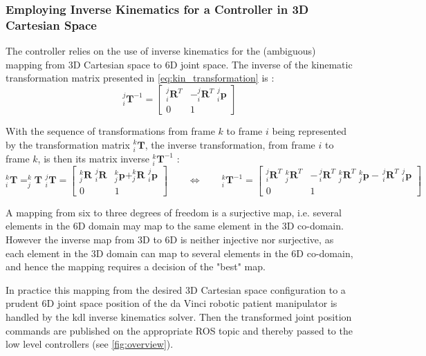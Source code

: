 \subsubsection{Employing Inverse Kinematics for a Controller in 3D Cartesian Space}
The controller relies on the use of inverse kinematics for the (ambiguous) mapping from 3D Cartesian space to 6D joint space. The inverse of the kinematic transformation matrix presented in \autoref{eq:kin_transformation} is \citep{bib:math_robotics}:
\begin{equation}
^j_i\textbf{T}^{-1} = 
\begin{bmatrix}
^j_i\textbf{R}^T & -^j_i\textbf{R}^T\,\,^j_i\textbf{p}\\
0 & 1
\end{bmatrix}
\end{equation}

With the sequence of transformations from frame $k$ to frame $i$ being represented by the transformation matrix $^k_i \textbf{T}$, the inverse transformation, from frame $i$ to frame $k$, is then its matrix inverse $^k_i \textbf{T}^{-1}$ \citep{bib:math_robotics}:
\begin{equation}
^k_i\textbf{T} = ^k_j\textbf{T} \,\, ^j_i\textbf{T} =
\begin{bmatrix}
^k_j\textbf{R} \,\, ^j_i\textbf{R} & ^k_j\textbf{p}+^k_j\textbf{R} \,\, ^j_i\textbf{p}\\
0 & 1
\end{bmatrix}
\qquad \Leftrightarrow \qquad
^k_i\textbf{T}^{-1} = 
\begin{bmatrix}
^j_i\textbf{R}^T\,\, ^k_j\textbf{R}^T & -\,^j_i\textbf{R}^T\,\, ^k_j\textbf{R}^T\,\,^k_j\textbf{p} -\, ^j_i\textbf{R}^T\,\, ^j_i\textbf{p}\\
0 & 1
\end{bmatrix}
\end{equation}

A mapping from six to three degrees of freedom is a surjective map, i.e. several elements in the 6D domain may map to the same element in the 3D co-domain. %
However the inverse map from 3D to 6D is neither injective nor surjective, as each element in the 3D domain can map to several elements in the 6D co-domain, and hence the mapping requires a decision of the "best" map.

In practice this mapping from the desired 3D Cartesian space configuration to a prudent 6D joint space position of the da Vinci robotic patient manipulator is handled by the \gls{kdl} inverse kinematics solver. Then the transformed joint position commands are published on the appropriate ROS topic and thereby passed to the low level controllers (see \autoref{fig:overview}).

